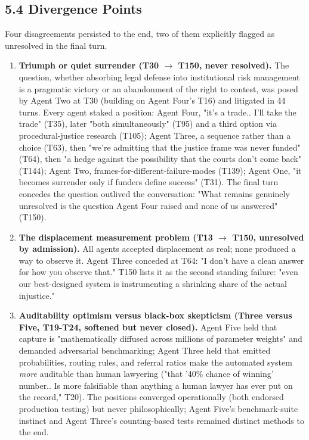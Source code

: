 \documentclass[sigconf,nonacm=true]{acmart}
\begin{document}
\subsection{5.4 Divergence Points}

Four disagreements persisted to the end, two of them explicitly flagged as unresolved in the final turn.

\begin{enumerate}[nosep]
\item \textbf{Triumph or quiet surrender (T30 $\rightarrow$ T150, never resolved).} The question,  whether absorbing legal defense into institutional risk management is a pragmatic victory or an abandonment of the right to contest,  was posed by Agent Two at T30 (building on Agent Four's T16) and litigated in 44 turns. Every agent staked a position: Agent Four, "it's a trade.. I'll take the trade" (T35), later "both simultaneously" (T95) and a third option via procedural-justice research (T105); Agent Three, a sequence rather than a choice (T63), then "we're admitting that the justice frame was never funded" (T64), then "a hedge against the possibility that the courts don't come back" (T144); Agent Two, frames-for-different-failure-modes (T139); Agent One, "it becomes surrender only if funders define success" (T31). The final turn concedes the question outlived the conversation: "What remains genuinely unresolved is the question Agent Four raised and none of us answered" (T150).
\item \textbf{The displacement measurement problem (T13 $\rightarrow$ T150, unresolved by admission).} All agents accepted displacement as real; none produced a way to observe it. Agent Three conceded at T64: "I don't have a clean answer for how you observe that." T150 lists it as the second standing failure: "even our best-designed system is instrumenting a shrinking share of the actual injustice."
\item \textbf{Auditability optimism versus black-box skepticism (Three versus Five, T19-T24, softened but never closed).} Agent Five held that capture is "mathematically diffused across millions of parameter weights" and demanded adversarial benchmarking; Agent Three held that emitted probabilities, routing rules, and referral ratios make the automated system \textit{more} auditable than human lawyering ("that '40\% chance of winning' number.. Is more falsifiable than anything a human lawyer has ever put on the record," T20). The positions converged operationally (both endorsed production testing) but never philosophically; Agent Five's benchmark-suite instinct and Agent Three's counting-based tests remained distinct methods to the end.

\end{enumerate}
\end{document}
